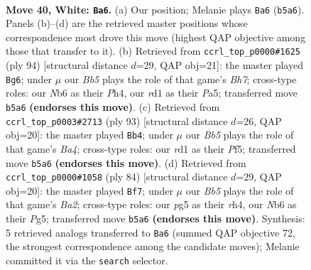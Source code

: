 \documentclass[11pt]{article}
\begin{document}
\clearpage

\begin{figure}[p]\centering
\begin{subfigure}{0.46\textwidth}\centering
\resizebox{\linewidth}{!}{%
\newchessgame
\chessboard[
  setfen={8/6k1/1N6/1B2p1p1/3n1p2/5P2/5K2/3r4 w - - 2 40},
  showmover=false,
  pgfstyle=straightmove, color=movearrow, markmove={b5-a6}
]}
\caption{}
\end{subfigure}\hfill
\begin{subfigure}{0.46\textwidth}\centering
\resizebox{\linewidth}{!}{%
\newchessgame
\chessboard[
  setfen={8/1p4pB/2pk1n2/P7/3P3P/2K5/8/8 w - - 1 48},
  showmover=false,
  pgfstyle=straightmove, color=movearrow, markmove={h7-g6}
]}
\caption{}
\end{subfigure}
\\[4pt]
\begin{subfigure}{0.46\textwidth}\centering
\resizebox{\linewidth}{!}{%
\newchessgame
\chessboard[
  setfen={8/8/6pk/b4p2/2N2P1P/6P1/6K1/8 b - - 2 47},
  showmover=false,
  pgfstyle=straightmove, color=movearrow, markmove={a5-b4}
]}
\caption{}
\end{subfigure}\hfill
\begin{subfigure}{0.46\textwidth}\centering
\resizebox{\linewidth}{!}{%
\newchessgame
\chessboard[
  setfen={7k/8/6p1/6Pp/3P3r/2n2K2/BR6/8 w - - 0 43},
  showmover=false,
  pgfstyle=straightmove, color=movearrow, markmove={a2-f7}
]}
\caption{}
\end{subfigure}
\caption{\textbf{Move 40, White: \texttt{Ba6}.} (a) Our position; Melanie plays \texttt{Ba6} (\texttt{b5a6}). Panels (b)--(d) are the retrieved master positions whose correspondence most drove this move (highest QAP objective among those that transfer to it). (b) Retrieved from \texttt{ccrl\_top\_p0000\#1625} (ply 94) [structural distance $d$=29, QAP obj=21]: the master played \texttt{Bg6}; under $\mu$ our \emph{Bb5} plays the role of that game's \emph{Bh7}; cross-type roles: our \emph{N}b6 as their \emph{P}h4, our \emph{r}d1 as their \emph{P}a5; transferred move \texttt{b5a6} \textbf{(endorses this move)}. (c) Retrieved from \texttt{ccrl\_top\_p0003\#2713} (ply 93) [structural distance $d$=26, QAP obj=20]: the master played \texttt{Bb4}; under $\mu$ our \emph{Bb5} plays the role of that game's \emph{Ba4}; cross-type roles: our \emph{r}d1 as their \emph{P}f5; transferred move \texttt{b5a6} \textbf{(endorses this move)}. (d) Retrieved from \texttt{ccrl\_top\_p0000\#1058} (ply 84) [structural distance $d$=29, QAP obj=20]: the master played \texttt{Bf7}; under $\mu$ our \emph{Bb5} plays the role of that game's \emph{Ba2}; cross-type roles: our \emph{p}g5 as their \emph{r}h4, our \emph{N}b6 as their \emph{P}g5; transferred move \texttt{b5a6} \textbf{(endorses this move)}. Synthesis: 5 retrieved analogs transferred to \texttt{Ba6} (summed QAP objective 72, the strongest correspondence among the candidate moves); Melanie committed it via the \texttt{search} selector.}
\label{fig:thought-m78}
\end{figure}
\end{document}

